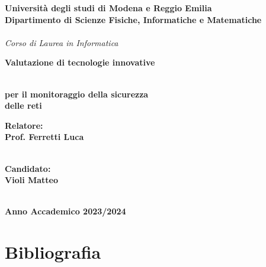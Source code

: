 \documentclass[12pt,a4paper,oneside,onecolumn,openright]{book}
\begin{document}
	\begin{titlepage}
		\begin{center}
			{
				\large
				\textbf{Università  degli studi di Modena e Reggio Emilia} \\
				\textbf{Dipartimento di Scienze Fisiche, Informatiche e Matematiche} \\
				\hspace*{0cm} \hrulefill \hspace*{0cm} \\
				\emph{Corso di Laurea in Informatica}
				
				
				
				\huge{\bf Valutazione di tecnologie innovative}}\\
			\vspace{3mm}
			{\huge{\bf per il monitoraggio della sicurezza }}\\
			\vspace{3mm}
			\vspace{3mm}
			{\huge{\bf delle reti}}\\
			\vspace{3mm}
			\vspace{3mm}
			
		\end{center}
		
		\vspace{40mm}
		\par
		\noindent
		\begin{minipage}[t]{0.47\textwidth}
			{\large{\bf Relatore:\\
					Prof.
					Ferretti Luca}}\\ 
			\\
		\end{minipage}
		\hfill
		\begin{minipage}[t]{0.47\textwidth}\raggedleft
			{\large{\bf Candidato:\\
					Violi Matteo}}
		\end{minipage}
		\vspace{20mm}
		\begin{center}
			\hspace*{0cm} \hrulefill \hspace*{0cm} \\
			{\large{\bf 
					Anno Accademico 2023/2024}}
		\end{center}
		
	\end{titlepage}
	
	\tableofcontents
	
	
	
	
	
	
	
	
	
	\chapter{Bibliografia}
	\printbibliography[heading=none]
	
\end{document}
